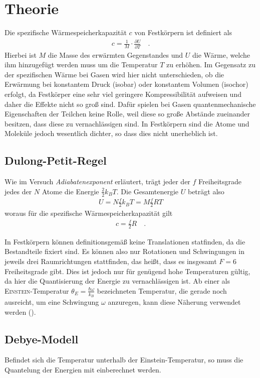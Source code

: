 \documentclass[12pt,a4paper,titlepage,headinclude,bibtotoc]{scrartcl}
\begin{document}
\section{Theorie}
\label{sec:theorie}
Die spezifische Wärmespeicherkapazität $c$ von Festkörpern ist definiert als
\begin{align}
	c=\frac{1}{M}\cdot \frac{\partial U}{\partial T} \quad .
\end{align}
Hierbei ist $M$ die Masse des erwärmten Gegenstandes und $U$ die Wärme, welche ihm hinzugefügt werden muss um  die Temperatur $T$ zu erhöhen.
Im Gegensatz zu der spezifischen Wärme bei Gasen wird hier nicht unterschieden, ob die Erwärmung bei konstantem Druck (isobar) oder konstantem Volumen (isochor) erfolgt, da Festkörper eine sehr viel geringere Kompressibilität aufweisen und daher die Effekte nicht so groß sind.
Dafür spielen bei Gasen quantenmechanische Eigenschaften der Teilchen keine Rolle, weil diese so große Abstände zueinander besitzen, dass diese zu vernachlässigen sind.
In Festkörpern sind die Atome und Moleküle jedoch wesentlich dichter, so dass dies nicht unerheblich ist.

\subsection{Dulong-Petit-Regel}
Wie im Versuch \textit{Adiabatenexponent} erläutert, trägt jeder der $f$ Freiheitsgrade jedes der $N$ Atome die Energie $\frac{2}{2}k_BT$.
Die Gesamtenergie $U$ beträgt also
\begin{align*}
	U=N\frac{f}{2}k_BT=M\frac{f}{2}RT
\end{align*}
woraus für die spezifische Wärmespeicherkapazität gilt
\begin{align}
	c=\frac{f}{2}R \label{eq:f2R}\quad .
\end{align}

In Festkörpern können definitionsgemäß keine Translationen statfinden, da die Bestandteile fixiert sind.
Es können also nur Rotationen und Schwingungen in jeweils drei Raumrichtungen stattfinden, das heißt, dass es insgesamt $F=6$ Freiheitsgrade gibt.
Dies ist jedoch nur für genügend hohe Temperaturen gültig, da hier die Quantisierung der Energie zu vernachlässigen ist.
Ab einer als \textsc{Einstein}-Temperatur $\theta_E=\frac{\hbar \omega}{k_B}$ bezeichneten Temperatur, die gerade noch ausreicht, um eine Schwingung $\omega$ anzuregen, kann diese Näherung verwendet werden (\cite[S. 879]{gerthsen}).

\subsection{Debye-Modell}
Befindet sich die Temperatur unterhalb der Einstein-Temperatur, so muss die Quantelung der Energien mit einberechnet werden.
\end{document}
